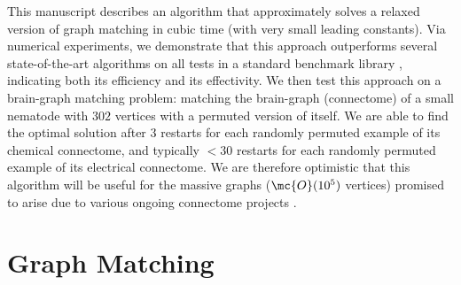 \documentclass[10pt,journal,cspaper,compsoc]{IEEEtran}
\begin{document}
This manuscript describes an algorithm that approximately solves a relaxed version of graph matching in cubic time (with very small leading constants).  Via numerical experiments, we demonstrate that this approach outperforms several state-of-the-art algorithms on all tests in a standard benchmark library \cite{Burkard1997}, indicating both its efficiency and its effectivity. We then test this approach on a brain-graph matching problem: matching the brain-graph (connectome) of a small nematode with $302$ vertices with a permuted version of itself.  We are able to find the optimal solution after $3$ restarts for each randomly permuted example of its chemical connectome, and typically $<30$ restarts for each randomly permuted example of its electrical connectome.  We are therefore optimistic that this algorithm will be useful for the massive graphs ($\mc{O}(10^5)$ vertices)  promised to arise due to various ongoing connectome projects \cite{HCP,OCP}.












\section{Graph  Matching} %
\label{sub:preliminaries}

\end{document}
